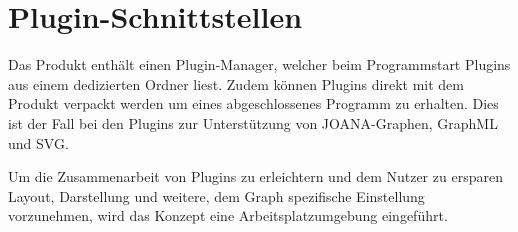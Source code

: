 \chapter{Plugin-Schnittstellen}
\label{ch:plugschnitt}

\setcounter{psnr}{10}
\newcommand{\psno}{\ifnum\value{psnr}<10 00\else\ifnum\value{psnr}<100 0\fi\fi\arabic{psnr}}
\newcommand\ps[2]{\namedlabel{s:#1}{/S\psno/}\addtocounter{psnr}{10}: & #2 \\ [1ex] }

Das Produkt enthält einen Plugin-Manager, welcher beim Programmstart Plugins aus einem dedizierten Ordner liest.
Zudem können Plugins direkt mit dem Produkt verpackt werden um eines abgeschlossenes Programm zu erhalten.
Dies ist der Fall bei den Plugins zur Unterstützung von JOANA-Graphen, GraphML und SVG.

Um die Zusammenarbeit von Plugins zu erleichtern und dem Nutzer zu ersparen Layout, Darstellung und weitere,
dem Graph spezifische Einstellung vorzunehmen, wird das Konzept eine Arbeitsplatzumgebung eingeführt.

